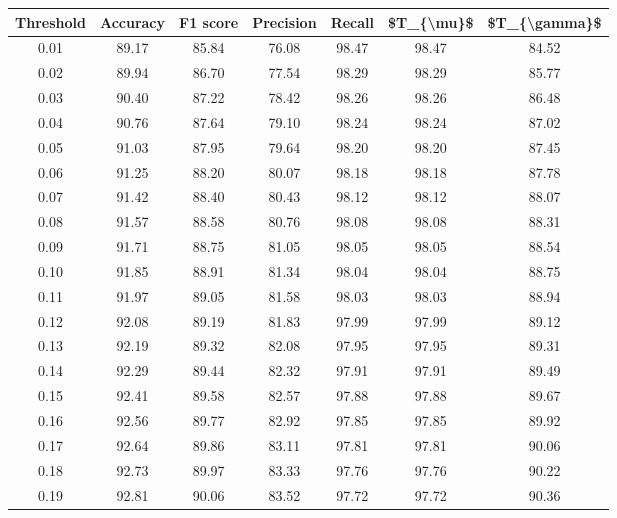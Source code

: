 \begin{tabular}{|c|c|c|c|c|c|c|}
\hline
 Threshold &  Accuracy &  F1 score &  Precision &  Recall &  \$T\_\{\textbackslash mu\}\$ &  \$T\_\{\textbackslash gamma\}\$ \\
\hline
      0.01 &     89.17 &     85.84 &      76.08 &   98.47 &      98.47 &         84.52 \\
      0.02 &     89.94 &     86.70 &      77.54 &   98.29 &      98.29 &         85.77 \\
      0.03 &     90.40 &     87.22 &      78.42 &   98.26 &      98.26 &         86.48 \\
      0.04 &     90.76 &     87.64 &      79.10 &   98.24 &      98.24 &         87.02 \\
      0.05 &     91.03 &     87.95 &      79.64 &   98.20 &      98.20 &         87.45 \\
      0.06 &     91.25 &     88.20 &      80.07 &   98.18 &      98.18 &         87.78 \\
      0.07 &     91.42 &     88.40 &      80.43 &   98.12 &      98.12 &         88.07 \\
      0.08 &     91.57 &     88.58 &      80.76 &   98.08 &      98.08 &         88.31 \\
      0.09 &     91.71 &     88.75 &      81.05 &   98.05 &      98.05 &         88.54 \\
      0.10 &     91.85 &     88.91 &      81.34 &   98.04 &      98.04 &         88.75 \\
      0.11 &     91.97 &     89.05 &      81.58 &   98.03 &      98.03 &         88.94 \\
      0.12 &     92.08 &     89.19 &      81.83 &   97.99 &      97.99 &         89.12 \\
      0.13 &     92.19 &     89.32 &      82.08 &   97.95 &      97.95 &         89.31 \\
      0.14 &     92.29 &     89.44 &      82.32 &   97.91 &      97.91 &         89.49 \\
      0.15 &     92.41 &     89.58 &      82.57 &   97.88 &      97.88 &         89.67 \\
      0.16 &     92.56 &     89.77 &      82.92 &   97.85 &      97.85 &         89.92 \\
      0.17 &     92.64 &     89.86 &      83.11 &   97.81 &      97.81 &         90.06 \\
      0.18 &     92.73 &     89.97 &      83.33 &   97.76 &      97.76 &         90.22 \\
      0.19 &     92.81 &     90.06 &      83.52 &   97.72 &      97.72 &         90.36 \\

\end{tabular}
